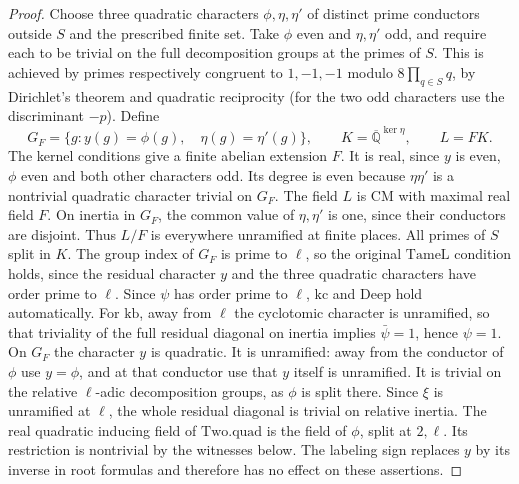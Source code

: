 \begin{proof}
Choose three quadratic characters $\phi,\eta,\eta'$ of distinct
prime conductors outside $S$ and the prescribed finite set.
Take $\phi$ even and $\eta,\eta'$ odd, and require each to be
trivial on the full decomposition groups at the primes of $S$.
This is achieved by primes respectively congruent to $1,-1,-1$
modulo $8\prod_{q\in S}q$, by Dirichlet's theorem and quadratic
reciprocity (for the two odd characters use the discriminant
$-p$). Define
\[
 G_F=\{g:y(g)=\phi(g),\quad\eta(g)=\eta'(g)\},\qquad
 K=\overline{\mathbb Q}^{\ker\eta},\qquad L=FK.
\]
The kernel conditions give a finite abelian extension $F$.
It is real, since $y$ is even, $\phi$ even and both other
characters odd. Its degree is even because $\eta\eta'$ is a
nontrivial quadratic character trivial on $G_F$. The field
$L$ is CM with maximal real field $F$. On inertia in $G_F$,
the common value of $\eta,\eta'$ is one, since their conductors
are disjoint. Thus $L/F$ is everywhere unramified at finite
places. All primes of $S$ split in $K$. The group index of
$G_F$ is prime to $\ell$, so the original $\mathrm{TameL}$
condition holds, since the residual character $y$ and the
three quadratic characters have order prime to $\ell$.
Since $\psi$ has order prime to $\ell$, $\mathrm{kc}$ and
$\mathrm{Deep}$ hold automatically. For $\mathrm{kb}$, away
from $\ell$ the cyclotomic character is unramified, so that
triviality of the full residual diagonal on inertia implies
$\bar\psi=1$, hence $\psi=1$. On $G_F$ the character $y$ is
quadratic. It is unramified: away from the conductor of $\phi$
use $y=\phi$, and at that conductor use that $y$ itself is
unramified. It is trivial on the relative $\ell$-adic
decomposition groups, as $\phi$ is split there. Since $\xi$
is unramified at $\ell$, the whole residual diagonal is
trivial on relative inertia. The real quadratic inducing
field of $\mathrm{Two.quad}$ is the field of $\phi$, split
at $2,\ell$. Its restriction is nontrivial by the witnesses
below. The labeling sign replaces $y$ by its inverse in
root formulas and therefore has no effect on these assertions.


\end{proof}

